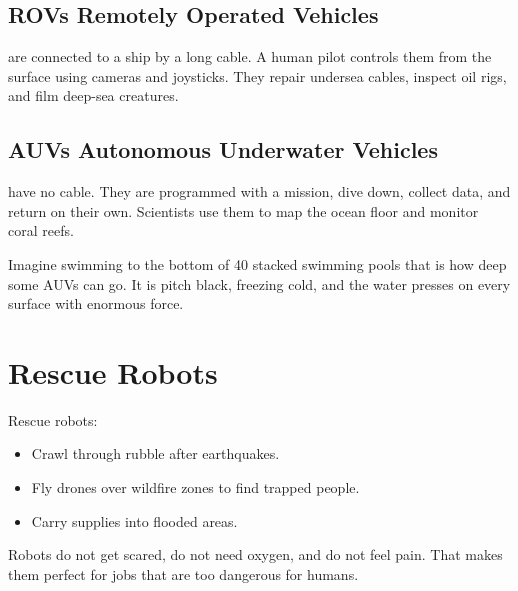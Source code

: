 \subsection*{ROVs \textemdash{} Remotely Operated Vehicles}

 are connected to a ship by a long cable. A human pilot
controls them from the surface using cameras and joysticks.
They repair undersea cables, inspect oil rigs, and film deep-sea creatures.

\subsection*{AUVs \textemdash{} Autonomous Underwater Vehicles}

 have no cable. They are programmed with a mission, dive down,
collect data, and return on their own. Scientists use them to map the
ocean floor and monitor coral reefs.

\begin{picturethis}
  Imagine swimming to the bottom of 40 stacked swimming pools \textemdash{}
  that is how deep some AUVs can go. It is pitch black, freezing cold,
  and the water presses on every surface with enormous force.
\end{picturethis}

\sectionrule

\section*{Rescue Robots}


Rescue robots:
\begin{itemize}
  \item Crawl through rubble after earthquakes.
  \item Fly drones over wildfire zones to find trapped people.
  \item Carry supplies into flooded areas.
\end{itemize}

\begin{bigidea}
  Robots do not get scared, do not need oxygen, and do not feel pain.
  That makes them perfect for jobs that are too dangerous for humans.
\end{bigidea}

